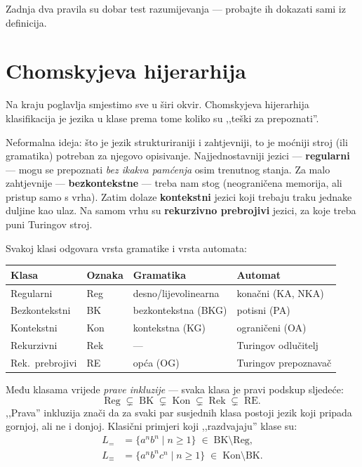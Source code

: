 Zadnja dva pravila su dobar test razumijevanja --- probajte ih dokazati sami
iz definicija.

\section{Chomskyjeva hijerarhija}

Na kraju poglavlja smjestimo sve u širi okvir. Chomskyjeva hijerarhija
klasifikacija je jezika u klase prema tome koliko su ,,teški za prepoznati''.

Neformalna ideja: što je jezik strukturiraniji i zahtjevniji, to je moćniji
stroj (ili gramatika) potreban za njegovo opisivanje. Najjednostavniji jezici
--- \textbf{regularni} --- mogu se prepoznati \emph{bez ikakva pamćenja} osim
trenutnog stanja. Za malo zahtjevnije --- \textbf{bezkontekstne} --- treba nam
stog (neograničena memorija, ali pristup samo s vrha). Zatim dolaze
\textbf{kontekstni} jezici koji trebaju traku jednake duljine kao ulaz.
Na samom vrhu su \textbf{rekurzivno prebrojivi} jezici, za koje treba
puni Turingov stroj.

Svakoj klasi odgovara vrsta gramatike i vrsta automata:

\begin{center}
\renewcommand{\arraystretch}{1.5}
\begin{tabular}{llll}
\hline
\textbf{Klasa} & \textbf{Oznaka} & \textbf{Gramatika} & \textbf{Automat} \\
\hline
Regularni        & Reg & desno/lijevolinearna & konačni (KA, NKA) \\
Bezkontekstni    & BK  & bezkontekstna (BKG)  & potisni (PA) \\
Kontekstni       & Kon & kontekstna (KG)      & ograničeni (OA) \\
Rekurzivni       & Rek & ---                  & Turingov odlučitelj \\
Rek.\ prebrojivi & RE  & opća (OG)            & Turingov prepoznavač \\
\hline
\end{tabular}
\end{center}

Među klasama vrijede \emph{prave inkluzije} --- svaka klasa je pravi
podskup sljedeće:
\[
  \mathrm{Reg} \;\subsetneq\; \mathrm{BK} \;\subsetneq\; \mathrm{Kon}
  \;\subsetneq\; \mathrm{Rek} \;\subsetneq\; \mathrm{RE}.
\]
,,Prava'' inkluzija znači da za svaki par susjednih klasa postoji jezik koji
pripada gornjoj, ali ne i donjoj. Klasični primjeri koji ,,razdvajaju''
klase su:
\begin{align*}
  L_{=}      &= \{a^n b^n \mid n \geq 1\} \;\in\; \mathrm{BK} \setminus \mathrm{Reg}, \\
  L_{\equiv} &= \{a^n b^n c^n \mid n \geq 1\} \;\in\; \mathrm{Kon} \setminus \mathrm{BK}.
\end{align*}

